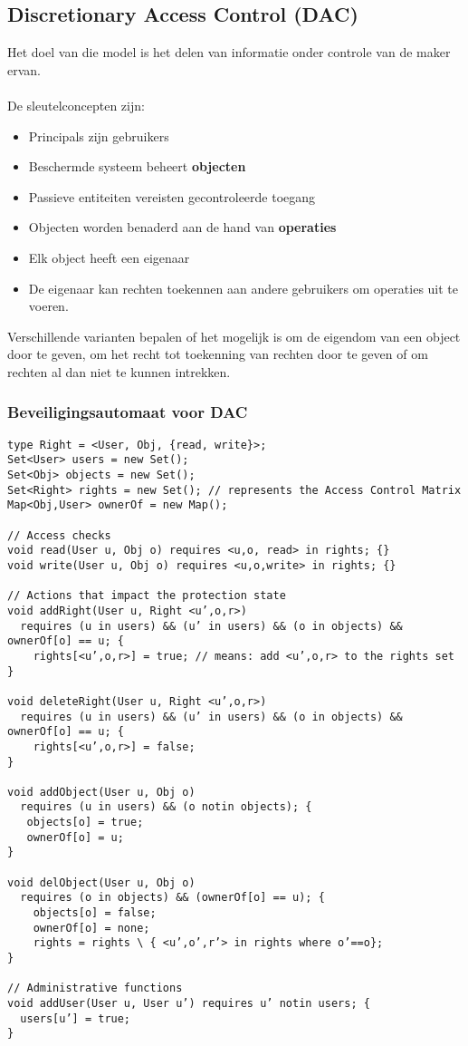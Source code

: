 \documentclass[../main.tex]{subfiles}
\begin{document}
\subsection{Discretionary Access Control (DAC)}
Het doel van die model is het delen van informatie onder controle van de maker ervan.
\\\\
De sleutelconcepten zijn:
\begin{multicols}{2}
\begin{itemize}
	\item Principals zijn gebruikers
	\item Beschermde systeem beheert \textbf{objecten}
	\item Passieve entiteiten vereisten gecontroleerde toegang
	\item Objecten worden benaderd aan de hand van \textbf{operaties}
	\item Elk object heeft een eigenaar
	\item De eigenaar kan rechten toekennen aan andere gebruikers om operaties uit te voeren.
\end{itemize}
\end{multicols}
\noindent
Verschillende varianten bepalen of het mogelijk is om de eigendom van een object door te geven, om het recht tot toekenning van rechten door te geven of om rechten al dan niet te kunnen intrekken.

\subsubsection{Beveiligingsautomaat voor DAC}
\begin{lstlisting}[caption=DAC Automaat]
type Right = <User, Obj, {read, write}>;
Set<User> users = new Set();
Set<Obj> objects = new Set();
Set<Right> rights = new Set(); // represents the Access Control Matrix
Map<Obj,User> ownerOf = new Map();

// Access checks
void read(User u, Obj o) requires <u,o, read> in rights; {}
void write(User u, Obj o) requires <u,o,write> in rights; {}

// Actions that impact the protection state
void addRight(User u, Right <u’,o,r>)
  requires (u in users) && (u’ in users) && (o in objects) && ownerOf[o] == u; {
    rights[<u’,o,r>] = true; // means: add <u’,o,r> to the rights set
}

void deleteRight(User u, Right <u’,o,r>)
  requires (u in users) && (u’ in users) && (o in objects) && ownerOf[o] == u; {
    rights[<u’,o,r>] = false;
}

void addObject(User u, Obj o)
  requires (u in users) && (o notin objects); {
   objects[o] = true;
   ownerOf[o] = u;
}

void delObject(User u, Obj o)
  requires (o in objects) && (ownerOf[o] == u); {
    objects[o] = false;
    ownerOf[o] = none;
    rights = rights \ { <u’,o’,r’> in rights where o’==o};
}

// Administrative functions
void addUser(User u, User u’) requires u’ notin users; {
  users[u’] = true;
}
\end{lstlisting}
\end{document}
